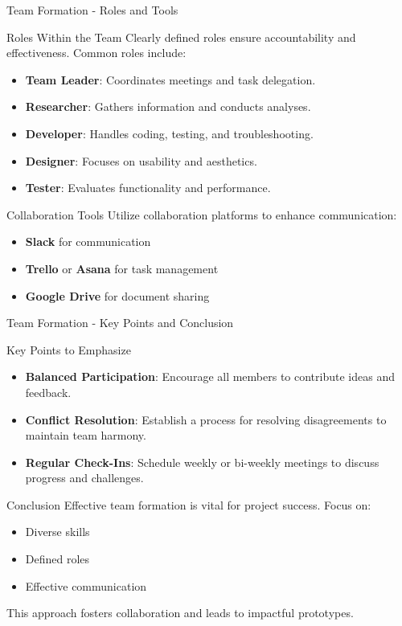 \documentclass[aspectratio=169]{beamer}
\begin{document}
\begin{frame}[fragile]{Team Formation - Roles and Tools}
  \begin{block}{Roles Within the Team}
    Clearly defined roles ensure accountability and effectiveness. Common roles include:
    \begin{itemize}
      \item \textbf{Team Leader}: Coordinates meetings and task delegation.
      \item \textbf{Researcher}: Gathers information and conducts analyses.
      \item \textbf{Developer}: Handles coding, testing, and troubleshooting.
      \item \textbf{Designer}: Focuses on usability and aesthetics.
      \item \textbf{Tester}: Evaluates functionality and performance.
    \end{itemize}
  \end{block}

  \begin{block}{Collaboration Tools}
    Utilize collaboration platforms to enhance communication:
    \begin{itemize}
      \item \textbf{Slack} for communication
      \item \textbf{Trello} or \textbf{Asana} for task management
      \item \textbf{Google Drive} for document sharing
    \end{itemize}
  \end{block}
\end{frame}

\begin{frame}[fragile]{Team Formation - Key Points and Conclusion}
  \begin{block}{Key Points to Emphasize}
    \begin{itemize}
      \item \textbf{Balanced Participation}: Encourage all members to contribute ideas and feedback.
      \item \textbf{Conflict Resolution}: Establish a process for resolving disagreements to maintain team harmony.
      \item \textbf{Regular Check-Ins}: Schedule weekly or bi-weekly meetings to discuss progress and challenges.
    \end{itemize}
  \end{block}

  \begin{block}{Conclusion}
    Effective team formation is vital for project success. Focus on:
    \begin{itemize}
      \item Diverse skills
      \item Defined roles
      \item Effective communication
    \end{itemize}
    This approach fosters collaboration and leads to impactful prototypes.
  \end{block}
\end{frame}
\end{document}
